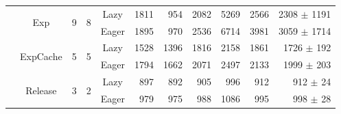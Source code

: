 \documentclass[sigplan,10pt,screen]{acmart}\settopmatter{printfolios=true,printccs=true,printacmref=true}
\begin{document}
\begin{table} [ht]
{\begin{tabular}{c|c|r|r|c|r|r|r|r|r|r}
							& \multirow{2}{*}{\small{Exp}} 		& \multirow{2}{*}{9} 		& \multirow{2}{*}{8}  		& \small{Lazy}	& 1811	& 954			& 2082	& 5269	& 2566		& 2308 $\pm$ 1191 	 \\
							&							& 					&				  	& \small{Eager}	& 1895	& 970			& 2536	& 6714	& 3981		& 3059 $\pm$ 1714 	 \\
							& \multirow{2}{*}{\small{ExpCache}} 	& \multirow{2}{*}{5} 		& \multirow{2}{*}{5}  		& \small{Lazy}	& 1528	& 1396			& 1816	& 2158	& 1861		& 1726 $\pm$ 192	 \\
							&							& 					&				  	& \small{Eager}	& 1794	& 1662			& 2071	& 2497	& 2133		& 1999 $\pm$ 203	 \\
							& \multirow{2}{*}{\small{Release}} 	& \multirow{2}{*}{3} 		& \multirow{2}{*}{2}  		& \small{Lazy}	& 897	& 892			& 905	& 996	& 912		& 912 $\pm$ 24	 \\
							&							& 					&				  	& \small{Eager}	& 979	& 975			& 988	& 1086	& 995		& 998 $\pm$ 28 	 \\

	\end{tabular} }
\label{tab:compactPause}
\vspace{-0.3cm}
\end{table}
\end{document}
